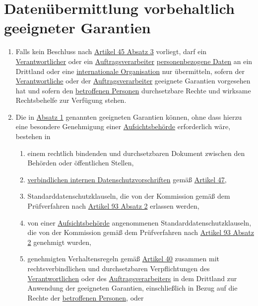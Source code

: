 \chapter{Datenübermittlung vorbehaltlich geeigneter Garantien}
\label{ch:46}


\begin{enumerate}

  \item Falls kein Beschluss nach \hyperref[itm:45-3]{Artikel 45 Absatz 3} vorliegt, darf ein \hyperref[itm:04-7]{Verantwortlicher} oder ein
   \hyperref[itm:04-8]{Auftragsverarbeiter} \hyperref[itm:04-1]{personenbezogene Daten} an ein Drittland oder eine \hyperref[itm:04-29]{internationale Organisation} nur übermitteln,
   sofern der \hyperref[itm:04-7]{Verantwortliche} oder der \hyperref[itm:04-8]{Auftragsverarbeiter} geeignete Garantien vorgesehen hat und sofern den
   \hyperref[itm:04-1]{betroffenen Personen} durchsetzbare Rechte und wirksame Rechtsbehelfe zur Verfügung stehen.
  \label{itm:46-1}

  \item Die in \hyperref[itm:46-1]{Absatz 1} genannten geeigneten Garantien können, ohne dass hierzu eine besondere
   Genehmigung einer \hyperref[itm:04-21]{Aufsichtsbehörde} erforderlich wäre, bestehen in
  \label{itm:46-2}

  \begin{enumerate}
  
    \item einem rechtlich bindenden und durchsetzbaren Dokument zwischen den Behörden oder öffentlichen Stellen,
    \label{itm:46-2a}

    \item \hyperref[itm:04-20]{verbindlichen internen Datenschutzvorschriften} gemäß \hyperref[ch:47]{Artikel 47},
    \label{itm:46-2b}

    \item Standarddatenschutzklauseln, die von der Kommission gemäß dem Prüfverfahren nach \hyperref[itm:93-2]
     {Artikel 93 Absatz 2} erlassen werden,
    \label{itm:46-2c}

    \item von einer \hyperref[itm:04-21]{Aufsichtsbehörde} angenommenen Standarddatenschutzklauseln, die von der Kommission gemäß dem
     Prüfverfahren nach \hyperref[itm:93-2]{Artikel 93 Absatz 2} genehmigt wurden,
    \label{itm:46-2d}

    \item genehmigten Verhaltensregeln gemäß \hyperref[ch:40]{Artikel 40} zusammen mit rechtsverbindlichen und
     durchsetzbaren Verpflichtungen des \hyperref[itm:04-7]{Verantwortlichen} oder des \hyperref[itm:04-8]{Auftragsverarbeiters} in dem Drittland zur Anwendung
     der geeigneten Garantien, einschließlich in Bezug auf die Rechte der \hyperref[itm:04-1]{betroffenen Personen}, oder
    \label{itm:46-2e}


\end{enumerate}
\end{enumerate}
